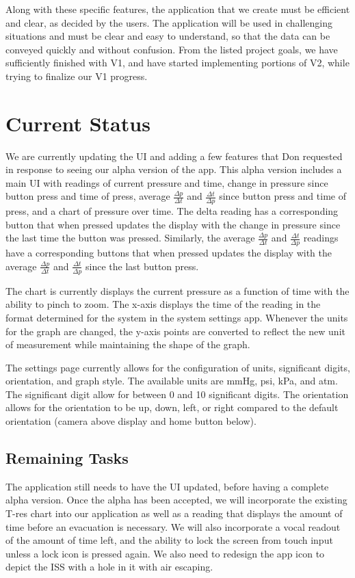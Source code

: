 \documentclass[onecolumn, draftclsnofoot,10pt, compsoc]{IEEEtran}
\begin{document}
Along with these specific features, the application that we create must be efficient and clear, as decided by the users.
The application will be used in challenging situations and must be clear and easy to understand, so that the data can be conveyed quickly and without confusion.
From the listed project goals, we have sufficiently finished with V1, and have started implementing portions of V2, while trying to finalize our V1 progress.


\section{Current Status}
    We are currently updating the UI and adding a few features that Don requested in response to seeing our alpha version of the app.
    This alpha version includes a main UI with readings of current pressure and time, change in pressure since button press and time of press, average $\frac{\Delta p}{\Delta t}$ and $\frac{\Delta t}{\Delta p}$ since button press and time of press, and a chart of pressure over time.
    The delta reading has a corresponding button that when pressed updates the display with the change in pressure since the last time the button was pressed.
    Similarly, the average $\frac{\Delta p}{\Delta t}$ and $\frac{\Delta t}{\Delta p}$ readings have a corresponding buttons that when pressed updates the display with the average $\frac{\Delta p}{\Delta t}$ and $\frac{\Delta t}{\Delta p}$ since the last button press.

    The chart is currently displays the current pressure as a function of time with the ability to pinch to zoom.
    The x-axis displays the time of the reading in the format determined for the system in the system settings app.
    Whenever the units for the graph are changed, the y-axis points are converted to reflect the new unit of measurement while maintaining the shape of the graph.

    The settings page currently allows for the configuration of units, significant digits, orientation, and graph style.
    The available units are mmHg, psi, kPa, and atm.
    The significant digit allow for between 0 and 10 significant digits.
    The orientation allows for the orientation to be up, down, left, or right compared to the default orientation (camera above display and home button below).

    \subsection{Remaining Tasks}
        The application still needs to have the UI updated, before having a complete alpha version.
        Once the alpha has been accepted, we will incorporate the existing T-res chart into our application as well as a reading that displays the amount of time before an evacuation is necessary.
        We will also incorporate a vocal readout of the amount of time left, and the ability to lock the screen from touch input unless a lock icon is pressed again.
        We also need to redesign the app icon to depict the ISS with a hole in it with air escaping.
\end{document}
